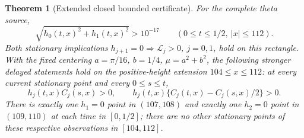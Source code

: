 \documentclass[11pt]{article}
\numberwithin{equation}{section}
\newtheorem{theorem}{Theorem}[section]
\theoremstyle{definition}
\theoremstyle{remark}
\newcommand{\Lag}{\mathcal L}
\begin{document}
\begin{theorem}[Extended closed bounded certificate]
\label{fc:height112}
For the complete theta source,
\[
 \sqrt{h_0(t,x)^2+h_1(t,x)^2}>10^{-17}
       \qquad(0\le t\le1/2,\ |x|\le112).
\]
Both stationary implications $h_{j+1}=0\Rightarrow\Lag_j>0$,
$j=0,1$, hold on this rectangle.  With the fixed centering
$a=\pi/16$, $b=1/4$, $\mu=a^2+b^2$, the following stronger delayed
statements hold on the positive-height extension $104\le x\le112$:
at every current stationary point and every $0\le s\le t$,
\begin{equation}
 h_j(t,x)C_j(s,x)>0,\qquad
 h_j(t,x)\{C_j(t,x)-C_j(s,x)/2\}>0.
 \label{eq:height112-causal}
\end{equation}
There is exactly one $h_1=0$ point in $(107,108)$ and exactly one
$h_2=0$ point in $(109,110)$ at each time in $[0,1/2]$; there are
no other stationary points of these respective observations in
$[104,112]$.
\end{theorem}
\end{document}
